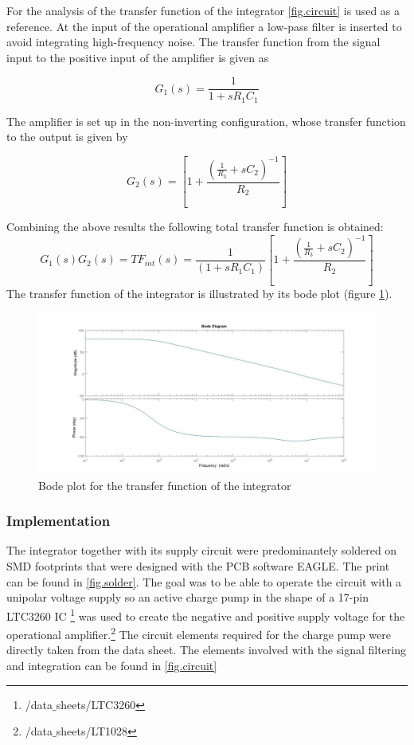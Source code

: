 For the analysis of the transfer function of the integrator \ref{fig.circuit} is used as a reference.
At the input of the operational amplifier a low-pass filter is inserted to avoid integrating high-frequency noise.
The transfer function from the signal input to the positive input of the amplifier is given as

\begin{equation}
  G_1(s)=\frac{1}{1+sR_1C_1}
\end{equation}

The amplifier is set up in the non-inverting configuration, whose transfer function to the output is given by

\begin{equation}
 G_2(s)=\left[1+\frac{\left(\frac{1}{R_3}+sC_2\right)^{-1}}{R_2}\right]
\end{equation}

Combining the above results the following total transfer function is obtained:
\begin{equation}
	G_1(s)G_2(s)=TF_{int}(s)=\frac{1}{(1+s R_1 C_1)}\left[1+\frac{\left(\frac{1}{R_3}+sC_2\right)^{-1}}{R_2}\right]
\end{equation}
The transfer function of the integrator is illustrated by its bode plot (figure \ref{fig.Bodeplot}). 

\begin{figure}[H]
\includegraphics[width=\textwidth]{figures/Method/integrator/transferfunction_int.jpg}
\caption[Kurze Abbildungsbeschreibung]{Bode plot for the transfer function of the integrator}
\label{fig.Bodeplot}
\end{figure}

\subsubsection{Implementation}
The integrator together with its supply circuit were predominantely soldered on SMD footprints that were designed
with the PCB software EAGLE. The print can be found in \ref{fig.solder}.
The goal was to be able to operate the circuit with a unipolar voltage supply so an active charge pump in the 
shape of a 17-pin LTC3260 IC \footnote{/data$\_$sheets/LTC3260} was used to create the negative and positive supply voltage for the operational amplifier.\footnote{/data$\_$sheets/LT1028}
The circuit elements required for the charge pump were directly taken from the data sheet. The elements involved with the signal 
filtering and integration can be found in \ref{fig.circuit}
    

